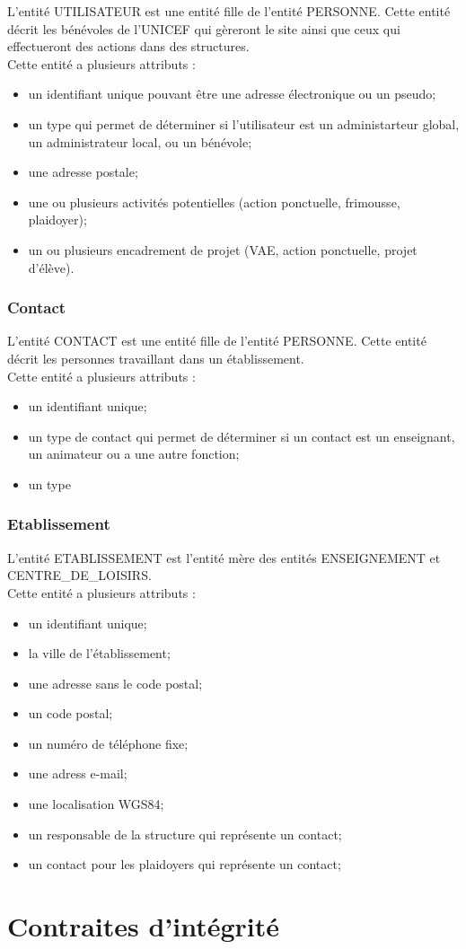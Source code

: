 \documentclass[asi, sansVersion]{picINSA}
\begin{document}
L'entité UTILISATEUR est une entité fille de l'entité PERSONNE. Cette entité décrit les bénévoles de l'UNICEF qui gèreront le site ainsi que ceux qui effectueront des actions dans des structures. \\
Cette entité a plusieurs attributs : 
\begin{itemize}
\item un identifiant unique pouvant être une adresse électronique ou un pseudo;  
\item un type qui permet de déterminer si l'utilisateur est un administarteur global, un administrateur local, ou un bénévole;
\item une adresse postale;
\item une ou plusieurs activités potentielles (action ponctuelle, frimousse, plaidoyer); %
\item un ou plusieurs encadrement de projet (VAE, action ponctuelle, projet d'élève). %
\end{itemize}

\subsection*{Contact}

L'entité CONTACT est une entité fille de l'entité PERSONNE. Cette entité décrit les personnes travaillant dans un établissement. \\
Cette entité a plusieurs attributs : 
\begin{itemize}
\item un identifiant unique;
\item un type de contact qui permet de déterminer si un contact est un enseignant, un animateur ou a une autre fonction; 
\item un type 
\end{itemize} 

\subsection*{Etablissement}

L'entité ETABLISSEMENT est l'entité mère des entités ENSEIGNEMENT et CENTRE_DE_LOISIRS. \\
Cette entité a plusieurs attributs : 
\begin{itemize}
\item un identifiant unique;
\item la ville de l'établissement;
\item une adresse sans le code postal;
\item un code postal;
\item un numéro de téléphone fixe;
\item une adress e-mail; %
\item une localisation WGS84; %
\item un responsable de la structure qui représente un contact; 
\item un contact pour les plaidoyers qui représente un contact;
\end{itemize}

\chapter{Contraites d'intégrité}
\end{document}
